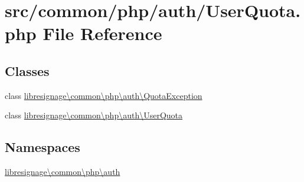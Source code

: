 \hypertarget{UserQuota_8php}{}\section{src/common/php/auth/\+User\+Quota.php File Reference}
\label{UserQuota_8php}
\subsection*{Classes}
\begin{DoxyCompactItemize}
\item 
class \hyperlink{classlibresignage_1_1common_1_1php_1_1auth_1_1QuotaException}{libresignage\textbackslash{}common\textbackslash{}php\textbackslash{}auth\textbackslash{}\+Quota\+Exception}
\item 
class \hyperlink{classlibresignage_1_1common_1_1php_1_1auth_1_1UserQuota}{libresignage\textbackslash{}common\textbackslash{}php\textbackslash{}auth\textbackslash{}\+User\+Quota}
\end{DoxyCompactItemize}
\subsection*{Namespaces}
\begin{DoxyCompactItemize}
\item 
 \hyperlink{namespacelibresignage_1_1common_1_1php_1_1auth}{libresignage\textbackslash{}common\textbackslash{}php\textbackslash{}auth}
\end{DoxyCompactItemize}
